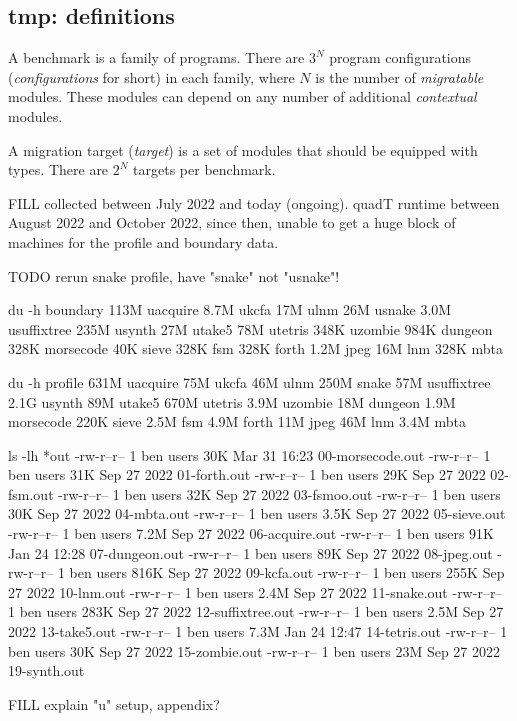 
\subsection{tmp: definitions}

A benchmark is a family of programs.
There are $3^N$ program configurations (\emph{configurations} for short)
in each family, where $N$ is the number of \emph{migratable} modules.
These modules can depend on any number of additional \emph{contextual} modules.

A migration target (\emph{target}) is a set of modules that should be equipped
with types.
There are $2^N$ targets per benchmark.

FILL collected between July 2022 and today (ongoing).
quadT runtime between August 2022 and October 2022, since then, unable to get a huge
block of machines for the profile and boundary data.

TODO rerun snake profile, have "snake" not "usnake"!

du -h boundary
113M	uacquire
8.7M	ukcfa
17M	ulnm
26M	usnake
3.0M	usuffixtree
235M	usynth
27M	utake5
78M	utetris
348K	uzombie
984K	dungeon
328K	morsecode
40K	sieve
328K	fsm
328K	forth
1.2M	jpeg
16M	lnm
328K	mbta

du -h profile
631M	uacquire
75M	ukcfa
46M	ulnm
250M	snake
57M	usuffixtree
2.1G	usynth
89M	utake5
670M	utetris
3.9M	uzombie
18M	dungeon
1.9M	morsecode
220K	sieve
2.5M	fsm
4.9M	forth
11M	jpeg
46M	lnm
3.4M	mbta

ls -lh *out
-rw-r--r-- 1 ben users  30K Mar 31 16:23 00-morsecode.out
-rw-r--r-- 1 ben users  31K Sep 27  2022 01-forth.out
-rw-r--r-- 1 ben users  29K Sep 27  2022 02-fsm.out
-rw-r--r-- 1 ben users  32K Sep 27  2022 03-fsmoo.out
-rw-r--r-- 1 ben users  30K Sep 27  2022 04-mbta.out
-rw-r--r-- 1 ben users 3.5K Sep 27  2022 05-sieve.out
-rw-r--r-- 1 ben users 7.2M Sep 27  2022 06-acquire.out
-rw-r--r-- 1 ben users  91K Jan 24 12:28 07-dungeon.out
-rw-r--r-- 1 ben users  89K Sep 27  2022 08-jpeg.out
-rw-r--r-- 1 ben users 816K Sep 27  2022 09-kcfa.out
-rw-r--r-- 1 ben users 255K Sep 27  2022 10-lnm.out
-rw-r--r-- 1 ben users 2.4M Sep 27  2022 11-snake.out
-rw-r--r-- 1 ben users 283K Sep 27  2022 12-suffixtree.out
-rw-r--r-- 1 ben users 2.5M Sep 27  2022 13-take5.out
-rw-r--r-- 1 ben users 7.3M Jan 24 12:47 14-tetris.out
-rw-r--r-- 1 ben users  30K Sep 27  2022 15-zombie.out
-rw-r--r-- 1 ben users  23M Sep 27  2022 19-synth.out


FILL explain "u" setup, appendix?




